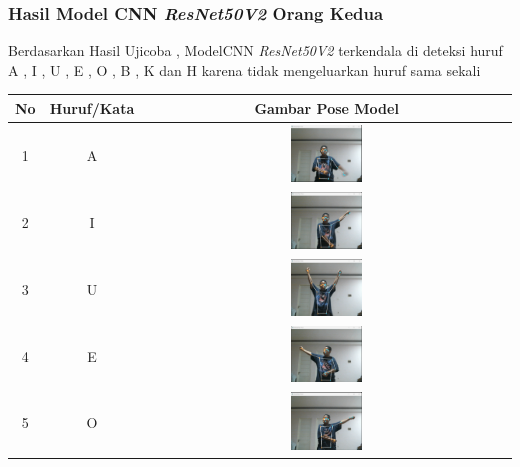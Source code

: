 \subsubsection*{Hasil Model CNN \textit{ResNet50V2 }Orang Kedua}

Berdasarkan Hasil Ujicoba ,  ModelCNN \textit{ResNet50V2 }terkendala di deteksi huruf A , I , U , E , O , B , K dan H karena tidak mengeluarkan huruf sama sekali


\begin{table}[!hbt]
	\centering
	\label{tbl:Tabel Contoh Huruf/Kata dan Gambar Pose Model CNN ResNet50V2 Orang Kedua}
	\begin{tabular}{|c|c|c|}
	\hline
	No & Huruf/Kata & Gambar Pose Model  \\
	\hline
	1 & A & \includegraphics[width=0.2\textwidth]{gambar/bener/HurufA_ModelCNNResNet50V2_Fachry.png} \\
	\hline
	2 & I & \includegraphics[width=0.2\textwidth]{gambar/bener/HurufI_ModelCNNResNet50V2_Fachry.png} \\
	\hline
	3 & U & \includegraphics[width=0.2\textwidth]{gambar/bener/HurufU_ModelCNNResNet50V2_Fachry.png} \\
	\hline
	4 & E & \includegraphics[width=0.2\textwidth]{gambar/bener/HurufE_ModelCNNResNet50V2_Fachry.png} \\
	\hline
	5 & O & \includegraphics[width=0.2\textwidth]{gambar/bener/HurufO_ModelCNNResNet50V2_Fachry.png} \\

\end{tabular}
\end{table}
